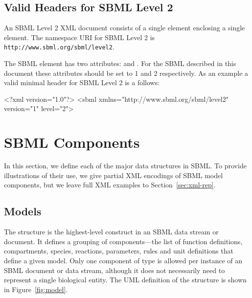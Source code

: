 \documentclass[10pt]{cekarticle}
\newcommand{\vref}[1]{\ref{#1}}
\begin{document}
\subsection{Valid Headers for SBML Level 2}
\label{sec:header}
An SBML Level 2 XML document consists of a single 
element enclosing a single  element.  The namespace
URI for SBML Level 2 is \texttt{http://www.sbml.org/sbml/level2}.

The SBML element has two attributes:  and
.  For the SBML described in this document these
attributes should be set to 1 and 2 respectively.  As an example a
valid minimal header for SBML Level 2 is a follows:

\begin{example}
<?xml version="1.0"?>
<sbml xmlns="http://www.sbml.org/sbml/level2" version="1" level="2">
\end{example}

\section{SBML Components}
\label{sec:elements}

In this section, we define each of the major data structures in SBML. To
provide illustrations of their use, we give partial XML encodings of SBML
model components, but we leave full XML examples to
Section~\ref{sec:xml-rep}.


\subsection{Models}
\label{sec:model}

The  structure is the highest-level construct in an
SBML data stream or document.  It defines a grouping of
components---the list of function definitions, compartments, species,
reactions, parameters, rules and unit definitions that
define a given model. Only one component of type  is
allowed per instance of an SBML document or data stream, although
it does not necessarily need to represent a single biological
entity.  The UML definition of the  structure is
shown in Figure~\vref{fig:model}.
\end{document}
